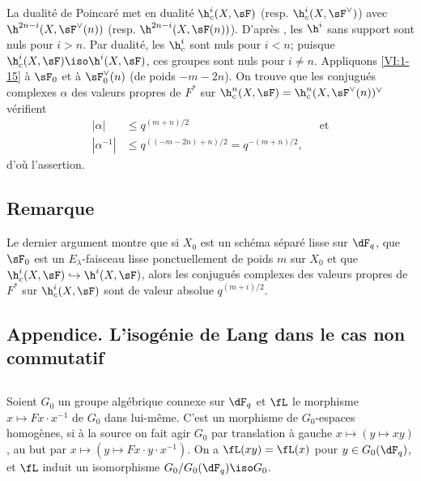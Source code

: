 La dualité de Poincaré met en dualité $\h_c^i(X,\sF)$ (resp. 
$\h_c^i(X,\sF^\vee)$) avec $\h^{2n-i}(X,\sF^\vee(n))$ (resp. 
$\h^{2n-i}(X,\sF(n))$). D'après \cite[XIV 3.2]{sga4}, les $\h^i$ sans support 
sont nuls pour $i>n$. Par dualité, les $\h_c^i$ sont nuls pour $i<n$; puisque 
$\h_c^i(X,\sF) \iso \h^i(X,\sF)$, ces groupes sont nuls pour $i\ne n$. 
Appliquons \ref{VI:1-15} à $\sF_0$ et à $\sF_0^\vee(n)$ (de poids 
$-m-2n$). On trouve que les conjugués complexes $\alpha$ des valeurs propres 
de $F^\ast$ sur $\h_c^n(X,\sF) = \h_c^n(X,\sF^\vee(n))^\vee$ vérifient 
\begin{align*}
  |\alpha| &\leqslant q^{(m+n)/2} && \text{et} \\
  |\alpha^{-1}| &\leqslant q^{((-m-2n)+n)/2} = q^{-(m+n)/2} \text{,}
\end{align*}
d'où l'assertion. 





\subsection{Remarque}\label{VI:1-21}

Le dernier argument montre que si $X_0$ est un schéma séparé lisse sur 
$\dF_q$, que $\sF_0$ est un $E_\lambda$-faisceau lisse ponctuellement de poids 
$m$ sur $X_0$ et que $\h_c^i(X,\sF) \hookrightarrow \h^i(X,\sF)$, alors les 
conjugués complexes des valeurs propres de $F^\ast$ sur $\h_c^i(X,\sF)$ sont 
de valeur absolue $q^{(m+i)/2}$. 





\subsection*{Appendice. L'isogénie de Lang dans le cas non commutatif}




\subsection{}\label{VI:1-22}

Soient $G_0$ un groupe algébrique connexe sur $\dF_q$ et $\fL$ le morphisme 
$x\mapsto F x\cdot x^{-1}$ de $G_0$ dans lui-même. C'est un morphisme de 
$G_0$-espaces homogènes, si à la source on fait agir $G_0$ par translation 
à gauche $x\mapsto (y\mapsto x y)$, au but par 
$x\mapsto (y\mapsto F x\cdot y\cdot x^{-1})$. On a $\fL(xy) = \fL(x)$ pour 
$y\in G_0(\dF_q)$, et $\fL$ induit un isomorphisme $G_0/G_0(\dF_q)\iso G_0$. 


